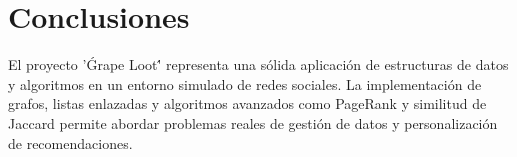 \section{Conclusiones}
El proyecto '\'Grape Loot\'' representa una sólida aplicación de estructuras de datos y algoritmos en un entorno simulado de redes sociales. La implementación de grafos, listas enlazadas y algoritmos avanzados como PageRank y similitud de Jaccard permite abordar problemas reales de gestión de datos y personalización de recomendaciones.
